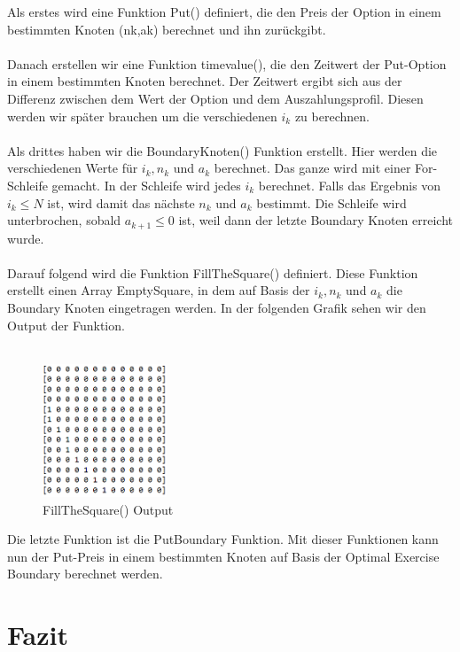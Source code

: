 \documentclass[12pt,a4paper]{article}
\begin{document}
\begin{text}
Als erstes wird eine Funktion Put() definiert, die den Preis der Option in einem bestimmten Knoten (nk,ak) berechnet und ihn zurückgibt.
\\\\
Danach erstellen wir eine Funktion timevalue(), die den Zeitwert der Put-Option in einem bestimmten Knoten berechnet. Der Zeitwert ergibt sich aus der Differenz zwischen dem Wert der Option und dem Auszahlungsprofil. Diesen werden wir später brauchen um die verschiedenen $i_k$ zu berechnen.
\\\\
Als drittes haben wir die BoundaryKnoten() Funktion erstellt. Hier werden die verschiedenen Werte für $i_k, n_k$ und $a_k $ berechnet. Das ganze wird mit einer For-Schleife gemacht. In der Schleife wird jedes $i_k$ berechnet. Falls das Ergebnis von $i_k \leq N$  ist, wird damit das nächste $n_k$ und $a_k$ bestimmt. Die Schleife wird unterbrochen, sobald $a_{k+1} \leq 0$ ist, weil dann der letzte Boundary Knoten erreicht wurde.
\\\\
Darauf folgend wird die Funktion FillTheSquare() definiert. Diese Funktion erstellt einen Array EmptySquare, in dem auf Basis der $i_k, n_k$ und $a_k$ die Boundary Knoten eingetragen werden. In der folgenden Grafik sehen wir den Output der Funktion.
\\\\
\begin{figure}[h]
\begin{center}
 \includegraphics[width=0.33\textwidth]{FillTheSquare.PNG}
 \caption{FillTheSquare() Output}
\end{center}
\end{figure}

Die letzte Funktion ist die PutBoundary Funktion. Mit dieser Funktionen kann nun der Put-Preis in einem bestimmten Knoten auf Basis der Optimal Exercise Boundary berechnet werden. 

\part{Fazit}


\end{text}
\end{document}
